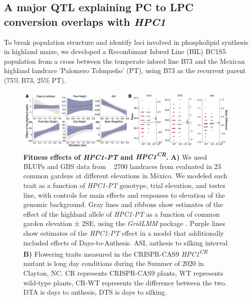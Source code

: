 \documentclass[9pt,twocolumn,twoside,lineno]{BioRxiv}
\begin{document}
\subsection{A major QTL explaining PC to LPC conversion overlaps with \textit{HPC1}} 
To break population structure and identify loci involved in phospholipid synthesis in highland maize, we developed a Recombinant Inbred Line (BIL) BC1S5 population from a cross between the temperate inbred line B73 and the Mexican highland landrace 'Palomero Toluqueño' (PT), using B73 as the recurrent parent (75\% B73, 25\% PT). 
\begin{figure}[!ht]
\begin{center}
\includegraphics[width=0.8\paperwidth]{Figures/Fig_4.png}
\caption{\textbf{Fitness effects of \textit{HPC1-PT} and \textit{HPC1\textsuperscript{CR}}.} 
\textbf{A)} We used BLUPs and GBS data from ~ 2700 landraces from \cite{Gates2019-xu} evaluated in 23 common gardens at different elevations in México. 
We modeled each trait as a function of \textit{HPC1-PT} genotype, trial elevation, and tester line, with controls for main effects and responses to elevation of the genomic background. 
Gray lines and ribbons show estimates of the effect of the highland allele of \textit{HPC1-PT} as a function of common garden elevation ± 2SE, using the \textit{GridLMM} package \cite{Runcie2019-Gr}. 
Purple lines show estimates of the \textit{HPC1-PT} effect in a model that additionally included effects of Days-to-Anthesis. ASI, anthesis to silking interval
\textbf{B)} Flowering traits measured in the CRISPR-CAS9 \textit{HPC1\textsuperscript{CR}} mutant is long day conditions during the Summer of 2020 in Clayton, NC. 
CR represents CRISPR-CAS9 plants, WT represents wild-type plants, CR-WT represents the difference between the two. DTA is days to anthesis, DTS is days to silking.} 
\label{Fig4}
\end{center}
\end{figure}
\end{document}
